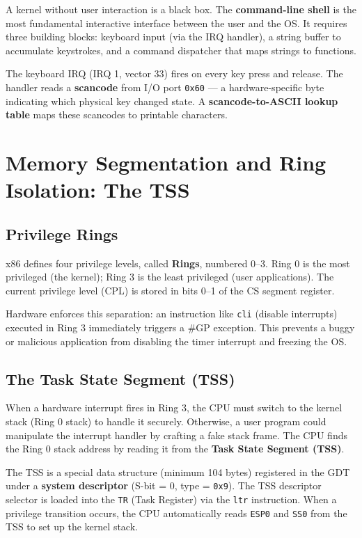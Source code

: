 \documentclass[12pt,a4paper]{report}
\begin{document}
A kernel without user interaction is a black box. The \textbf{command-line shell}
is the most fundamental interactive interface between the user and the OS. It requires
three building blocks: keyboard input (via the IRQ handler), a string buffer to
accumulate keystrokes, and a command dispatcher that maps strings to functions.

The keyboard IRQ (IRQ 1, vector 33) fires on every key press and release. The handler
reads a \textbf{scancode} from I/O port \texttt{0x60} --- a hardware-specific byte
indicating which physical key changed state. A \textbf{scancode-to-ASCII lookup table}
maps these scancodes to printable characters.

\section{Memory Segmentation and Ring Isolation: The TSS}

\subsection{Privilege Rings}

x86 defines four privilege levels, called \textbf{Rings}, numbered 0--3. Ring 0 is the
most privileged (the kernel); Ring 3 is the least privileged (user applications).
The current privilege level (CPL) is stored in bits 0--1 of the CS segment register.

Hardware enforces this separation: an instruction like \texttt{cli} (disable interrupts)
executed in Ring 3 immediately triggers a \#GP exception. This prevents a buggy or
malicious application from disabling the timer interrupt and freezing the OS.

\subsection{The Task State Segment (TSS)}

When a hardware interrupt fires in Ring 3, the CPU must switch to the kernel stack
(Ring 0 stack) to handle it securely. Otherwise, a user program could manipulate the
interrupt handler by crafting a fake stack frame. The CPU finds the Ring 0 stack
address by reading it from the \textbf{Task State Segment (TSS)}.

The TSS is a special data structure (minimum 104 bytes) registered in the GDT under a
\textbf{system descriptor} (S-bit = 0, type = \texttt{0x9}). The TSS descriptor selector
is loaded into the \texttt{TR} (Task Register) via the \texttt{ltr} instruction. When a
privilege transition occurs, the CPU automatically reads \texttt{ESP0} and \texttt{SS0}
from the TSS to set up the kernel stack.
\end{document}
